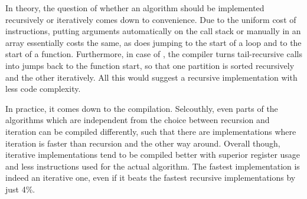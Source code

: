 %

In theory, the question of whether an algorithm should be implemented recursively or iteratively comes down to convenience.
Due to the uniform cost of instructions, putting arguments automatically on the call stack or manually in an array essentially costs the same, as does jumping to the start of a loop and to the start of a function.
Furthermore, in case of \QS{}, the compiler turns tail-recursive calls into jumps back to the function start, so that one partition is sorted recursively and the other iteratively.
All this would suggest a recursive implementation with less code complexity.

In practice, it comes down to the compilation.
Selcouthly, even parts of the algorithms which are independent from the choice between recursion and iteration can be compiled differently, such that there are implementations where iteration is faster than recursion and the other way around.
Overall though, iterative implementations tend to be compiled better with superior register usage and less instructions used for the actual \QS{} algorithm.
The fastest implementation is indeed an iterative one, even if it beats the fastest recursive implementations by just 4\%.

